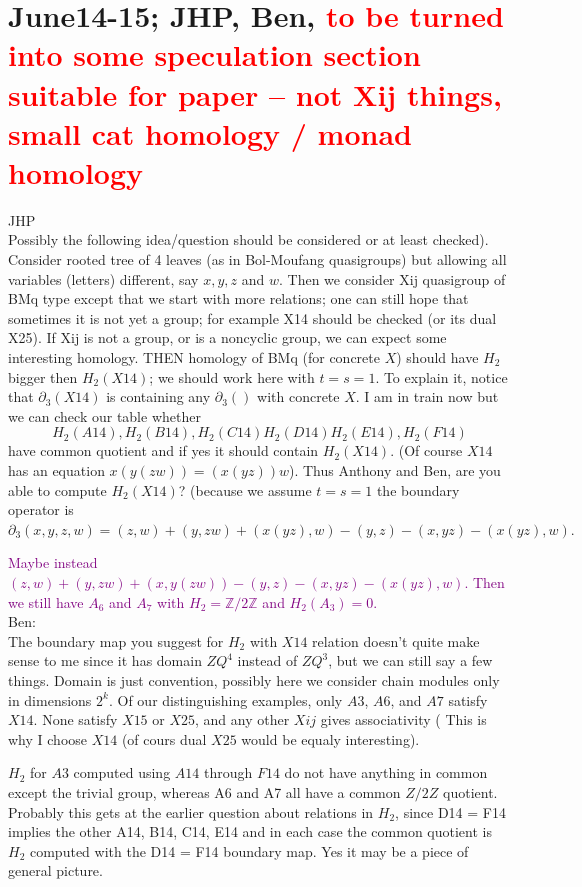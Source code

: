 \documentclass[11pt]{amsart}
\theoremstyle{definition}
\newcommand{\Z}{\mathbb{Z}}
\begin{document}
\section{June14-15; JHP, Ben, \textcolor{red}{to be turned into some speculation section suitable for paper -- not Xij things, small cat homology / monad homology}}
{\color{red} JHP} \\
Possibly the following idea/question should be considered or at least checked).
Consider rooted tree of 4 leaves (as in Bol-Moufang quasigroups) but allowing all variables (letters) different, say $x,y,z$ and $w$.
Then we consider Xij quasigroup of BMq type except that we start with more relations; one can still hope that sometimes it is not yet a group;
for example X14 should be checked (or its dual X25). If Xij  is not a group, or is a noncyclic group, we can expect some interesting
homology.
THEN homology of BMq (for concrete $X$) should have $H_2$ bigger then $H_2(X14)$; we should work here with $t=s=1$.
To explain it, notice that $\partial_3 (X14)$ is containing any $\partial_3()$ with concrete $X$.
I am in train now but we can check our table whether $$H_2(A14), H_2(B14), H_2(C14) H_2(D14) H_2(E14), H_2(F14)$$ have common quotient and
if yes it should contain $H_2(X14)$. (Of course $X14$ has an equation $ x(y(zw)) = (x(yz))w $).
Thus Anthony and Ben, are you able to compute $H_2(X14)$?
(because we assume $t=s=1$ the boundary operator is
$\partial_3(x,y,z,w)= (z,w)+(y,zw)+ (x(yz),w) - (y,z) - (x,yz)- (x(yz),w). $

\noindent \textcolor{purple}{Maybe instead $(z,w)+(y,zw)+ (x,y(zw)) - (y,z) - (x,yz)- (x(yz),w)$. Then we still have $A_6$ and $A_7$ with $H_2 = \Z/2\Z$ and $H_2(A_3) = 0$.}\\

{\color{red} Ben:}\\
The boundary map you suggest for $H_2$ with $X14$ relation doesn't quite make sense to me since it has domain $ZQ^4$ instead of $ZQ^3$, but we can still say a few things. 
{\color{red} Domain is just convention, possibly here we consider chain modules only in dimensions $2^k$.}
Of our distinguishing examples, only $A3$, $A6$, and $A7$ satisfy $X14$. None satisfy $X15$ or $X25$, and any other $Xij$ gives associativity ({\color{red} This is why I choose $X14$ (of cours dual $X25$ would be equaly interesting)}. 

$H_2$ for $A3$ computed using $A14$ through $F14$ do not have anything in common except the trivial group, whereas A6 and A7 all have a common $Z/2Z$ quotient. Probably this gets at the earlier question about relations in $H_2$, since D14 = F14 implies the other A14, B14, C14, E14 and in each case the common quotient is $H_2$ computed with the D14 = F14 boundary map.   {\color{red}Yes it may be a piece of general picture.}  
\fi
\end{document}
